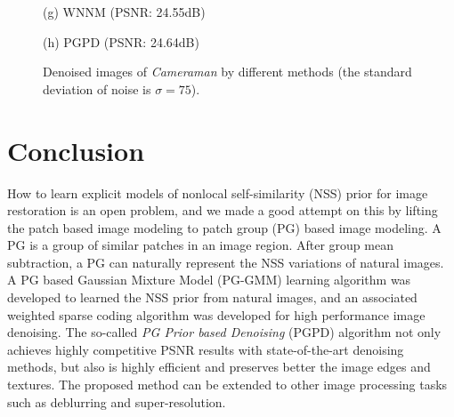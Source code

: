 \begin{figure*}
{\begin{minipage}[t]{0.244\textwidth}
{\footnotesize (g) WNNM (PSNR: 24.55dB)}
\end{minipage}
\begin{minipage}[t]{0.244\textwidth}
\centering
{}
{\footnotesize (h) PGPD (PSNR: 24.64dB)}
\end{minipage}
}
\caption{Denoised images of \textsl{Cameraman} by different methods (the standard deviation of noise is $\sigma=75$).}
\vspace{-0.18in}
\label{fig7}
\end{figure*}
\section{Conclusion}
\vspace{-0.03in}
How to learn explicit models of nonlocal self-similarity (NSS) prior for image restoration is an open problem, and we made a good attempt on this by lifting the patch based image modeling to patch group (PG) based image modeling. A PG is a group of similar patches in an image region. After group mean subtraction, a PG can naturally represent the NSS variations of natural images. A PG based Gaussian Mixture Model (PG-GMM) learning algorithm was developed to learned the NSS prior from natural images, and an associated weighted sparse coding algorithm was developed for high performance image denoising. The so-called \textsl{PG Prior based Denoising} (PGPD) algorithm not only achieves highly competitive PSNR results with state-of-the-art denoising methods, but also is highly efficient and preserves better the image edges and textures. The proposed method can be extended to other image processing tasks such as deblurring and super-resolution.
\vspace{-0.25in}